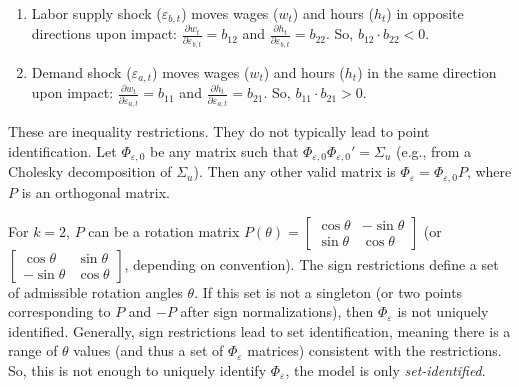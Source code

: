 \documentclass[a4paper,12pt]{article} %
\theoremstyle{nonitalic}
\newenvironment{solution}[1]
  {\renewcommand\theinnercustomsol{#1}%
   \innercustomsol}
  {\endinnercustomsol}
\newcounter{solutionctr}[section]
\renewcommand{\thesolutionctr}{(\alph{solutionctr})}
\newenvironment{autosolution}
  {\refstepcounter{solutionctr}%
   \begin{solution}{\thesolutionctr}}
  {\end{solution}}
\begin{document}
\begin{autosolution}
    \

    \begin{enumerate}
        \item Labor supply shock ($\varepsilon_{b,t}$) moves wages ($w_t$) and hours ($h_t$) in opposite directions upon impact:
        $\frac{\partial w_t}{\partial \varepsilon_{b,t}} = b_{12}$ and $\frac{\partial h_t}{\partial \varepsilon_{b,t}} = b_{22}$.
        So, $b_{12} \cdot b_{22} < 0$.
        \item Demand shock ($\varepsilon_{a,t}$) moves wages ($w_t$) and hours ($h_t$) in the same direction upon impact:
        $\frac{\partial w_t}{\partial \varepsilon_{a,t}} = b_{11}$ and $\frac{\partial h_t}{\partial \varepsilon_{a,t}} = b_{21}$.
        So, $b_{11} \cdot b_{21} > 0$.
    \end{enumerate}
    These are inequality restrictions. They do not typically lead to point identification.
    Let $\Phi_{\varepsilon,0}$ be any matrix such that $\Phi_{\varepsilon,0} \Phi_{\varepsilon,0}' = \Sigma_u$ (e.g., from a Cholesky decomposition of $\Sigma_u$).
    Then any other valid matrix is $\Phi_{\varepsilon} = \Phi_{\varepsilon,0} P$, where $P$ is an orthogonal matrix.
    
    For $k=2$, $P$ can be a rotation matrix 
    $P(\theta) = \begin{bmatrix}
        \cos\theta & -\sin\theta \\
        \sin\theta & \cos\theta
    \end{bmatrix}$
    (or $\begin{bmatrix}
        \cos\theta & \sin\theta \\
        -\sin\theta & \cos\theta
    \end{bmatrix}$, depending on convention).
    The sign restrictions define a set of admissible rotation angles $\theta$.
    If this set is not a singleton (or two points corresponding to $P$ and $-P$ after sign normalizations),
    then $\Phi_{\varepsilon}$ is not uniquely identified. Generally, sign restrictions lead to set identification,
    meaning there is a range of $\theta$ values (and thus a set of $\Phi_{\varepsilon}$ matrices) consistent with the restrictions.
    So, this is not enough to uniquely identify $\Phi_{\varepsilon}$, the model is only \emph{set-identified}.
\end{autosolution}
\end{document}
